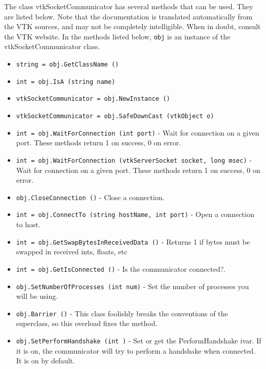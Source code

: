 The class vtkSocketCommunicator has several methods that can be used.
  They are listed below.
Note that the documentation is translated automatically from the VTK sources,
and may not be completely intelligible.  When in doubt, consult the VTK website.
In the methods listed below, \verb|obj| is an instance of the vtkSocketCommunicator class.
\begin{itemize}
\item  \verb|string = obj.GetClassName ()|

\item  \verb|int = obj.IsA (string name)|

\item  \verb|vtkSocketCommunicator = obj.NewInstance ()|

\item  \verb|vtkSocketCommunicator = obj.SafeDownCast (vtkObject o)|

\item  \verb|int = obj.WaitForConnection (int port)| -  Wait for connection on a given port.
 These methods return 1 on success, 0 on error.

\item  \verb|int = obj.WaitForConnection (vtkServerSocket socket, long msec)| -  Wait for connection on a given port.
 These methods return 1 on success, 0 on error.

\item  \verb|obj.CloseConnection ()| -  Close a connection.

\item  \verb|int = obj.ConnectTo (string hostName, int port)| -  Open a connection to host.

\item  \verb|int = obj.GetSwapBytesInReceivedData ()| -  Returns 1 if bytes must be swapped in received ints, floats, etc

\item  \verb|int = obj.GetIsConnected ()| -  Is the communicator connected?.

\item  \verb|obj.SetNumberOfProcesses (int num)| -  Set the number of processes you will be using.

\item  \verb|obj.Barrier ()| -  This class foolishly breaks the conventions of the superclass, so this
 overload fixes the method.

\item  \verb|obj.SetPerformHandshake (int )| -  Set or get the PerformHandshake ivar. If it is on, the communicator
 will try to perform a handshake when connected.
 It is on by default.


\end{itemize}
